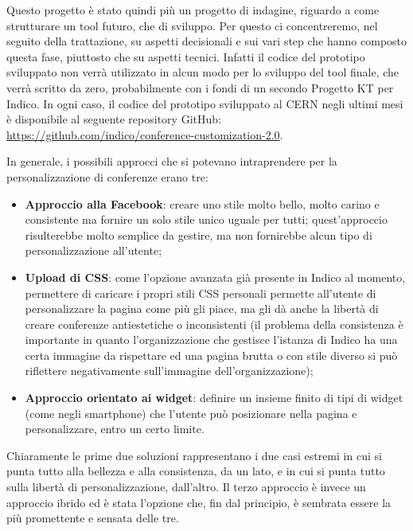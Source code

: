             Questo progetto è stato quindi più un progetto di indagine, riguardo a come strutturare un tool futuro, che di sviluppo. Per questo ci concentreremo, nel seguito della trattazione, su aspetti decisionali e sui vari step che hanno composto questa fase, piuttosto che su aspetti tecnici. Infatti il codice del prototipo sviluppato non verrà utilizzato in alcun modo per lo sviluppo del tool finale, che verrà scritto da zero, probabilmente con i fondi di un secondo Progetto KT per Indico. In ogni caso, il codice del prototipo sviluppato al \ac{CERN} negli ultimi mesi è disponibile al seguente repository GitHub: \url{https://github.com/indico/conference-customization-2.0}.
            
            In generale, i possibili approcci che si potevano intraprendere per la personalizzazione di conferenze erano tre:
            
            \begin{itemize}
                \item \textbf{Approccio alla Facebook}: creare uno stile molto bello, molto carino e consistente ma fornire un solo stile unico uguale per tutti; quest'approccio risulterebbe molto semplice da gestire, ma non fornirebbe alcun tipo di personalizzazione all'utente;
                \item \textbf{Upload di \ac{CSS}}: come l'opzione avanzata già presente in Indico al momento, permettere di caricare i propri stili \ac{CSS} personali permette all'utente di personalizzare la pagina come più gli piace, ma gli dà anche la libertà di creare conferenze antiestetiche o inconsistenti (il problema della consistenza è importante in quanto l'organizzazione che gestisce l'istanza di Indico ha una certa immagine da rispettare ed una pagina brutta o con stile diverso si può riflettere negativamente sull'immagine dell'organizzazione);
                \item \textbf{Approccio orientato ai widget}: definire un insieme finito di tipi di widget (come negli smartphone) che l'utente può posizionare nella pagina e personalizzare, entro un certo limite.
            \end{itemize}
            
            Chiaramente le prime due soluzioni rappresentano i due casi estremi in cui si punta tutto alla bellezza e alla consistenza, da un lato, e in cui si punta tutto sulla libertà di personalizzazione, dall'altro. Il terzo approccio è invece un approccio ibrido ed è stata l'opzione che, fin dal principio, è sembrata essere la più promettente e sensata delle tre.
            

